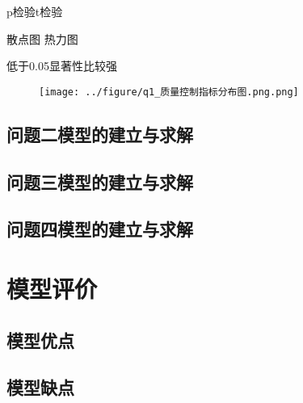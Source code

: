 \documentclass[withoutpreface,bwprint]{cumcmthesis} %
\begin{document}
p检验t检验

散点图 热力图

低于0.05显著性比较强

\begin{figure}
    \centering
    \texttt{[image: ../figure/q1\_质量控制指标分布图.png.png]}
    \caption{}
    \label{fig:heatmap}
\end{figure}

\subsection{问题二模型的建立与求解}

\subsection{问题三模型的建立与求解}

\subsection{问题四模型的建立与求解}

\section{模型评价}
\subsection{模型优点}

\subsection{模型缺点}




\begin{appendices}
\end{appendices}
\end{document}
